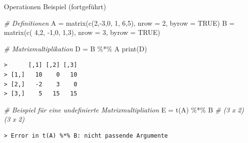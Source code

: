 \documentclass[
  8pt,
  ignorenonframetext,
]{beamer}
\newenvironment{Shaded}{\begin{snugshade}}{\end{snugshade}}
\newcommand{\AttributeTok}[1]{\textcolor[rgb]{0.77,0.63,0.00}{#1}}
\newcommand{\CommentTok}[1]{\textcolor[rgb]{0.56,0.35,0.01}{\textit{#1}}}
\newcommand{\ConstantTok}[1]{\textcolor[rgb]{0.00,0.00,0.00}{#1}}
\newcommand{\DecValTok}[1]{\textcolor[rgb]{0.00,0.00,0.81}{#1}}
\newcommand{\FunctionTok}[1]{\textcolor[rgb]{0.00,0.00,0.00}{#1}}
\newcommand{\NormalTok}[1]{#1}
\newcommand{\OtherTok}[1]{\textcolor[rgb]{0.56,0.35,0.01}{#1}}
\newcommand{\SpecialCharTok}[1]{\textcolor[rgb]{0.00,0.00,0.00}{#1}}
\begin{document}
\begin{frame}[fragile]{Operationen}
\protect\hypertarget{operationen-19}{}
Beispiel (fortgeführt) \vspace{1mm}

\footnotesize

\begin{Shaded}
\begin{Highlighting}[]
\CommentTok{\# Definitionen}
\NormalTok{A }\OtherTok{=} \FunctionTok{matrix}\NormalTok{(}\FunctionTok{c}\NormalTok{(}\DecValTok{2}\NormalTok{,}\SpecialCharTok{{-}}\DecValTok{3}\NormalTok{,}\DecValTok{0}\NormalTok{,}
             \DecValTok{1}\NormalTok{, }\DecValTok{6}\NormalTok{,}\DecValTok{5}\NormalTok{),}
           \AttributeTok{nrow  =} \DecValTok{2}\NormalTok{,}
           \AttributeTok{byrow =} \ConstantTok{TRUE}\NormalTok{)}
\NormalTok{B }\OtherTok{=} \FunctionTok{matrix}\NormalTok{(}\FunctionTok{c}\NormalTok{( }\DecValTok{4}\NormalTok{,}\DecValTok{2}\NormalTok{,}
             \SpecialCharTok{{-}}\DecValTok{1}\NormalTok{,}\DecValTok{0}\NormalTok{,}
              \DecValTok{1}\NormalTok{,}\DecValTok{3}\NormalTok{),}
           \AttributeTok{nrow  =} \DecValTok{3}\NormalTok{,}
           \AttributeTok{byrow =} \ConstantTok{TRUE}\NormalTok{)}

\CommentTok{\# Matrixmultiplikation}
\NormalTok{D }\OtherTok{=}\NormalTok{ B }\SpecialCharTok{\%*\%}\NormalTok{ A}
\FunctionTok{print}\NormalTok{(D)}
\end{Highlighting}
\end{Shaded}

\begin{verbatim}
>      [,1] [,2] [,3]
> [1,]   10    0   10
> [2,]   -2    3    0
> [3,]    5   15   15
\end{verbatim}

\vspace{1mm}

\begin{Shaded}
\begin{Highlighting}[]
\CommentTok{\# Beispiel für eine undefinierte Matrixmultipliation}
\NormalTok{E }\OtherTok{=} \FunctionTok{t}\NormalTok{(A) }\SpecialCharTok{\%*\%}\NormalTok{ B      }\CommentTok{\# (3 x 2)(3 x 2)}
\end{Highlighting}
\end{Shaded}

\begin{verbatim}
> Error in t(A) %*% B: nicht passende Argumente
\end{verbatim}
\end{frame}
\end{document}
